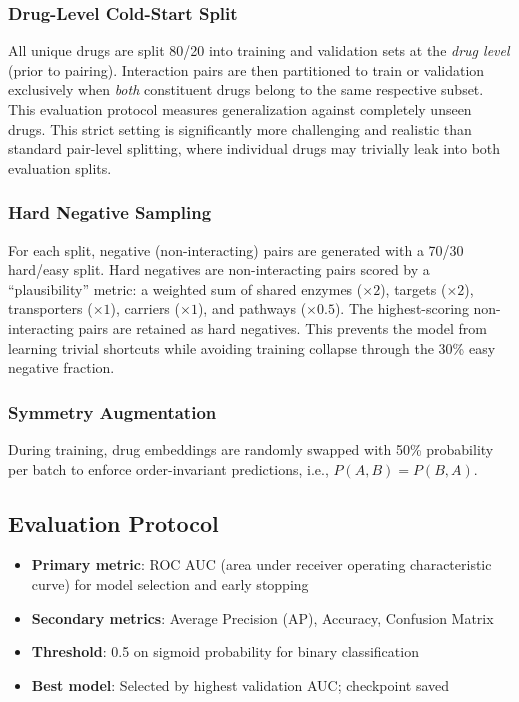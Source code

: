 \documentclass[conference]{IEEEtran}
\begin{document}
\subsubsection{Drug-Level Cold-Start Split}
All unique drugs are split 80/20 into training and validation sets at the \textit{drug level} (prior to pairing). Interaction pairs are then partitioned to train or validation exclusively when \textit{both} constituent drugs belong to the same respective subset. This evaluation protocol measures generalization against completely unseen drugs. This strict setting is significantly more challenging and realistic than standard pair-level splitting, where individual drugs may trivially leak into both evaluation splits.

\subsubsection{Hard Negative Sampling}
For each split, negative (non-interacting) pairs are generated with a 70/30 hard/easy split. Hard negatives are non-interacting pairs scored by a ``plausibility'' metric: a weighted sum of shared enzymes ($\times 2$), targets ($\times 2$), transporters ($\times 1$), carriers ($\times 1$), and pathways ($\times 0.5$). The highest-scoring non-interacting pairs are retained as hard negatives. This prevents the model from learning trivial shortcuts while avoiding training collapse through the 30\% easy negative fraction.

\subsubsection{Symmetry Augmentation}
During training, drug embeddings are randomly swapped with 50\% probability per batch to enforce order-invariant predictions, i.e., $P(A, B) = P(B, A)$.

\subsection{Evaluation Protocol}
\begin{itemize}
    \item \textbf{Primary metric}: ROC AUC (area under receiver operating characteristic curve) for model selection and early stopping
    \item \textbf{Secondary metrics}: Average Precision (AP), Accuracy, Confusion Matrix
    \item \textbf{Threshold}: 0.5 on sigmoid probability for binary classification
    \item \textbf{Best model}: Selected by highest validation AUC; checkpoint saved
\end{itemize}
\end{document}
